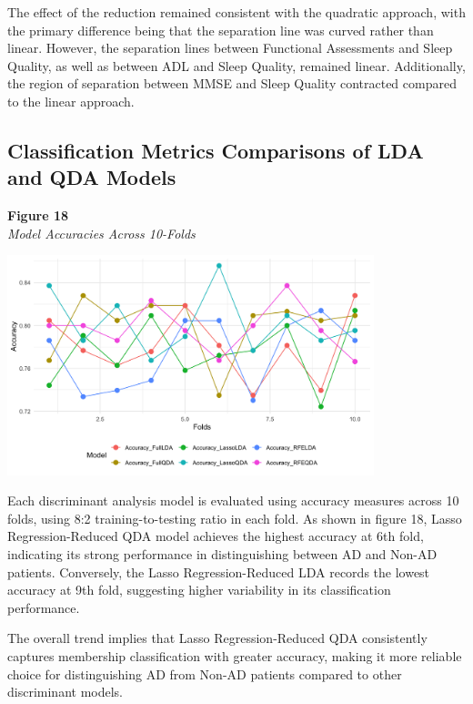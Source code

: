 \documentclass[12pt]{article}
\begin{document}
The effect of the reduction remained consistent with the quadratic approach, with the primary difference being that the separation line was curved rather than linear. However, the separation lines between Functional Assessments and Sleep Quality, as well as between ADL and Sleep Quality, remained linear. 
Additionally, the region of separation between MMSE and Sleep Quality contracted compared to the linear approach.

\newpage
\subsection{Classification Metrics Comparisons of LDA and QDA Models}
\textbf{Figure 18} \\
\textit{Model Accuracies Across 10-Folds}
\begin{center}
    \includegraphics[width = 0.8\textwidth]{Accuracy_Line_plots.png}
\end{center}

Each discriminant analysis model is evaluated using accuracy measures across 10 folds, using 8:2 training-to-testing ratio in each fold. As shown in figure 18, Lasso Regression-Reduced QDA model achieves the highest accuracy at 6th fold, 
indicating its strong performance in distinguishing between AD and Non-AD patients. Conversely, the Lasso Regression-Reduced LDA records the lowest accuracy at 9th fold, suggesting higher variability in its classification performance. 

The overall trend implies that Lasso Regression-Reduced QDA consistently captures membership classification with greater accuracy, making it more reliable choice for distinguishing AD from Non-AD patients compared to other discriminant models. 
\end{document}
